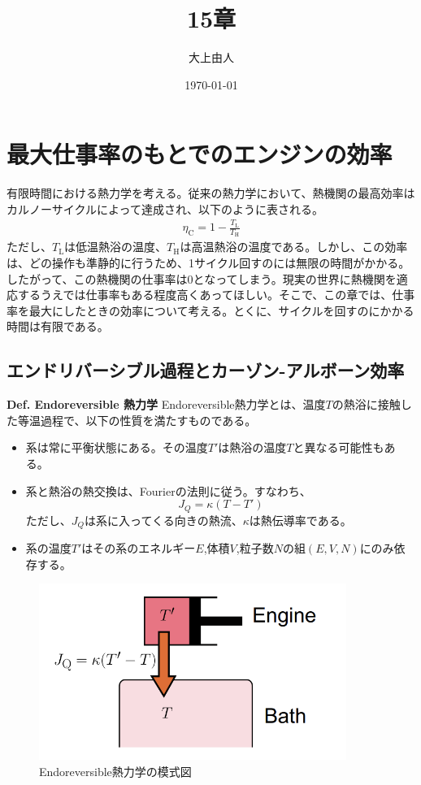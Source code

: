 \documentclass[a4paper,10.5pt]{jsarticle}
\numberwithin{equation}{section}
\begin{document}
\title{15章}
\author{大上由人}
\date{\today}
\maketitle
\setcounter{section}{14}

\section{最大仕事率のもとでのエンジンの効率}
有限時間における熱力学を考える。従来の熱力学において、熱機関の最高効率はカルノーサイクルによって達成され、以下のように表される。
\begin{align}
  \eta_{\text{C}} = 1 - \frac{T_{\text{L}}}{T_{\text{H}}}
\end{align}
ただし、$T_{\text{L}}$は低温熱浴の温度、$T_{\text{H}}$は高温熱浴の温度である。しかし、この効率は、どの操作も準静的に行うため、1サイクル回すのには無限の時間がかかる。
したがって、この熱機関の仕事率は0となってしまう。現実の世界に熱機関を適応するうえでは仕事率もある程度高くあってほしい。そこで、この章では、仕事率を最大にしたときの効率について考える。とくに、サイクルを回すのにかかる時間は有限である。

\subsection{エンドリバーシブル過程とカーゾン-アルボーン効率}
\begin{itembox}[l]{\textbf{Def. Endoreversible 熱力学}}
  Endoreversible熱力学とは、温度$T$の熱浴に接触した等温過程で、以下の性質を満たすものである。
  \begin{itemize}
    \item 系は常に平衡状態にある。その温度$T'$は熱浴の温度$T$と異なる可能性もある。
    \item 系と熱浴の熱交換は、Fourierの法則に従う。すなわち、
    \begin{equation}
      J_{Q} = \kappa(T-T')
    \end{equation}
    ただし、$J_{Q}$は系に入ってくる向きの熱流、$\kappa$は熱伝導率である。
    \item 系の温度$T'$はその系のエネルギー$E$,体積$V$,粒子数$N$の組$(E,V,N)$にのみ依存する。
  \end{itemize}
\end{itembox}

\begin{figure}[H]
    \begin{center}
    \includegraphics[width=100mm]{endoreversible.png}
    \end{center}
    \caption{Endoreversible熱力学の模式図}
    \label{fig:endoreversible}
\end{figure}
\end{document}
